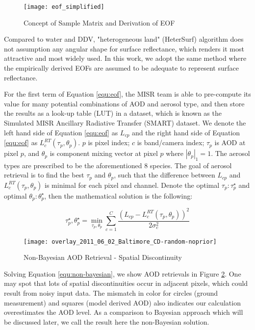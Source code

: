 \begin{figure}[h!]
\centering
\texttt{[image: eof\_simplified]}
\caption{Concept of Sample Matrix and Derivation of EOF}
\label{fig:eof_simplified}
\end{figure}

Compared to water and DDV, "heterogeneous land" (HeterSurf) algorithm does not assumption any angular shape for surface reflectance, which renders it most attractive and most widely used. In this work, we adopt the same method where the empirically derived EOFs are assumed to be adequate to represent surface reflectance.

For the first term of Equation \eqref{equ:eof}, the MISR team is able to pre-compute its value for many potential combinations of AOD and aerosol type, and then store the results as a look-up table (LUT) in a dataset, which is known as the Simulated MISR Ancillary Radiative Transfer (SMART) dataset. We denote the left hand side of Equation \eqref{equ:eof} as $L_{cp}$ and the right hand side of Equation \eqref{equ:eof} as $L_c^{RT}(\tau_p,\theta_p)$. $p$ is pixel index; $c$ is band/camera index; $\tau_p$ is AOD at pixel $p$, and $\theta_p$ is component mixing vector at pixel $p$ where $|\theta_p|_1=1$. The aerosol types are prescribed to be the aforementioned 8 species. The goal of aerosol retrieval is to find the best $\tau_p$ and $\theta_p$, such that the difference between $L_{cp}$ and $L_c^{RT}(\tau_p,\theta_p)$ is minimal for each pixel and channel. Denote the optimal $\tau_p: \tau_p^\star$ and optimal $\theta_p:\theta_p^\star$, then the mathematical solution is the following:

\begin{equation}
\tau_p^\star, \theta_p^\star = \min\limits_{\tau_p,\theta_p} \sum\limits_{c=1}^{C}\frac{\left(L_{cp}-  L_{c}^{RT}\left(\tau_p,\theta_p\right)\right)^2}{2\sigma_c^2} 
\label{equ:non-bayesian}
\end{equation}

    \begin{figure}[h!]
        \centering
        \texttt{[image: overlay\_2011\_06\_02\_Baltimore\_CD-random-noprior]}
        \caption{Non-Bayesian AOD Retrieval - Spatial Discontinuity}
        \label{fig:aod_CD-random_noprior}
    \end{figure}

Solving Equation \eqref{equ:non-bayesian}, we show AOD retrievals in Figure \ref{fig:aod_CD-random_noprior}. One may spot that lots of spatial discontinuities occur in adjacent pixels, which could result from noisy input data. The mismatch in color for circles (ground measurement) and squares (model derived AOD) also indicates our calculation overestimates the AOD level. As a comparison to Bayesian approach which will be discussed later, we call the result here the non-Bayesian solution.

